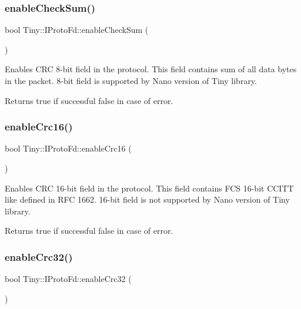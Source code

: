 \subsubsection{\texorpdfstring{enable\+Check\+Sum()}{enableCheckSum()}}
{\footnotesize\ttfamily bool Tiny\+::\+I\+Proto\+Fd\+::enable\+Check\+Sum (\begin{DoxyParamCaption}{ }\end{DoxyParamCaption})}

Enables C\+RC 8-\/bit field in the protocol. This field contains sum of all data bytes in the packet. 8-\/bit field is supported by Nano version of Tiny library. \begin{DoxyReturn}{Returns}
true if successful false in case of error. 
\end{DoxyReturn}
\mbox{\label{classTiny_1_1IProtoFd_a8b57afdb66434aa35409af34b04e1db9}} 
\subsubsection{\texorpdfstring{enable\+Crc16()}{enableCrc16()}}
{\footnotesize\ttfamily bool Tiny\+::\+I\+Proto\+Fd\+::enable\+Crc16 (\begin{DoxyParamCaption}{ }\end{DoxyParamCaption})}

Enables C\+RC 16-\/bit field in the protocol. This field contains F\+CS 16-\/bit C\+C\+I\+TT like defined in R\+FC 1662. 16-\/bit field is not supported by Nano version of Tiny library. \begin{DoxyReturn}{Returns}
true if successful false in case of error. 
\end{DoxyReturn}
\mbox{\label{classTiny_1_1IProtoFd_a1bf1f5211ae3a49caf73ee3de3bb9247}} 
\subsubsection{\texorpdfstring{enable\+Crc32()}{enableCrc32()}}
{\footnotesize\ttfamily bool Tiny\+::\+I\+Proto\+Fd\+::enable\+Crc32 (\begin{DoxyParamCaption}{ }\end{DoxyParamCaption})}

